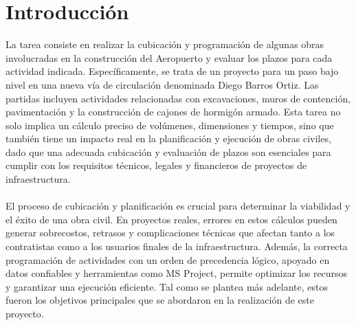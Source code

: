 \section{Introducción}

La tarea consiste en realizar la cubicación y programación de algunas obras involucradas en la construcción del Aeropuerto y evaluar los plazos para cada actividad indicada. Específicamente, se trata de un proyecto para un paso bajo nivel en una nueva vía de circulación denominada Diego Barros Ortiz. Las partidas incluyen actividades relacionadas con excavaciones, muros de contención, pavimentación y la construcción de cajones de hormigón armado. Esta tarea no solo implica un cálculo preciso de volúmenes, dimensiones y tiempos, sino que también tiene un impacto real en la planificación y ejecución de obras civiles, dado que una adecuada cubicación y evaluación de plazos son esenciales para cumplir con los requisitos técnicos, legales y financieros de proyectos de infraestructura. 
\\\\
El proceso de cubicación y planificación es crucial para determinar la viabilidad y el éxito de una obra civil. En proyectos reales, errores en estos cálculos pueden generar sobrecostos, retrasos y complicaciones técnicas que afectan tanto a los contratistas como a los usuarios finales de la infraestructura. Además, la correcta programación de actividades con un orden de precedencia lógico, apoyado en datos confiables y herramientas como MS Project, permite optimizar los recursos y garantizar una ejecución eficiente. Tal como se plantea más adelante, estos fueron los objetivos principales que se abordaron en la realización de este proyecto.
